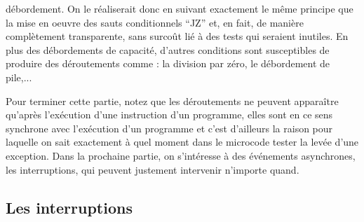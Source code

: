 débordement. On le réaliserait donc en suivant exactement le même principe que la mise en oeuvre des sauts conditionnels ``JZ'' et, en fait, de manière complètement transparente, sans surcoût lié à des tests qui seraient inutiles. En plus des débordements de capacité, d'autres conditions sont susceptibles de produire des déroutements comme : la division par zéro, le débordement de pile,...

Pour terminer cette partie, notez que les déroutements ne peuvent apparaître qu'après l'exécution d'une instruction d'un programme, elles sont en ce sens synchrone avec l'exécution d'un programme et c'est d'ailleurs la raison pour laquelle on sait exactement à quel moment dans le microcode tester la levée d'une exception. Dans la prochaine partie, on s'intéresse à des événements asynchrones, les interruptions, qui peuvent justement intervenir n'importe quand.

\subsection{Les interruptions}


